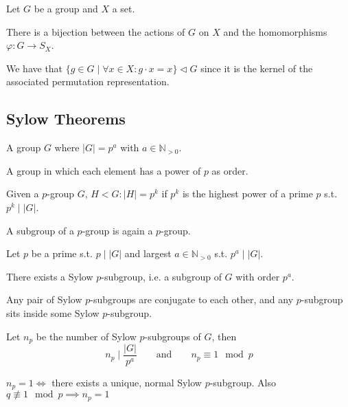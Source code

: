 \begin{proposition}
   Let \(G\) be a group and \(X\) a set.

   There is a bijection between the actions of \(G\) on \(X\) and the homomorphisms \(\varphi: G \to S_X\).
\end{proposition}
\begin{remark}
   We have that \(\{g \in G \mid \forall x \in X: g \cdot x = x\} \triangleleft G\) since it is the kernel of the associated permutation representation.
\end{remark}

\subsection{Sylow Theorems}
\begin{definition}[\(p\)-Group]
   A group \(G\) where \(|G| = p^a\) with \(a \in \mathbb{N}_{>0}\).
\end{definition}
\begin{remark}
   A group in which each element has a power of \(p\) as order.
\end{remark}

\begin{definition}
   Given a \(p\)-group \(G\), \(H < G: \lvert H\rvert = p^k\) if \(p^k\) is the highest power of a prime \(p\) s.t. \(p^k \mid \lvert G\rvert\).
\end{definition}
\begin{remark}
   A subgroup of a \(p\)-group is again a \(p\)-group.
\end{remark}

Let \(p\) be a prime s.t. \(p \mid \lvert G\rvert\) and largest \(a \in \mathbb{N}_{>0}\) s.t. \(p^a \mid \lvert G\rvert\).
\begin{theorem}
   There exists a Sylow \(p\)-subgroup, i.e. a subgroup of \(G\) with order \(p^a\).
\end{theorem}
\begin{theorem}
   Any pair of Sylow \(p\)-subgroups are conjugate to each other, and any \(p\)-subgroup sits inside some Sylow \(p\)-subgroup.
\end{theorem}
\begin{theorem}
   Let \(n_p\) be the number of Sylow \(p\)-subgroups of \(G\), then
   \[n_p \mid \frac{|G|}{p^a} \qquad\text{and}\qquad n_p \equiv 1 \mod p\]
\end{theorem}
\begin{remark}
   \(n_p = 1 \iff\) there exists a unique, normal Sylow \(p\)-subgroup.
   Also \(q \not\equiv 1 \mod p \implies n_p = 1\)
\end{remark}

